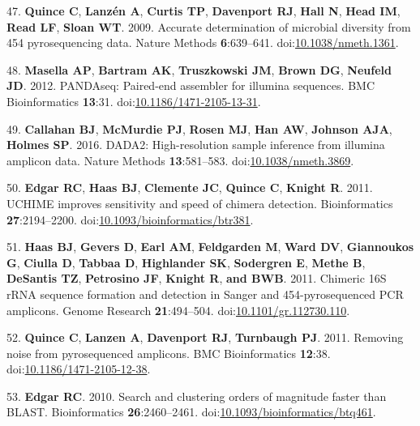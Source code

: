 \documentclass[11pt,]{article}
\begin{document}
\leavevmode\hypertarget{ref-Quince2009}{}%
47. \textbf{Quince C}, \textbf{Lanzén A}, \textbf{Curtis TP},
\textbf{Davenport RJ}, \textbf{Hall N}, \textbf{Head IM}, \textbf{Read
LF}, \textbf{Sloan WT}. 2009. Accurate determination of microbial
diversity from 454 pyrosequencing data. Nature Methods
\textbf{6}:639--641.
doi:\href{https://doi.org/10.1038/nmeth.1361}{10.1038/nmeth.1361}.

\leavevmode\hypertarget{ref-Masella2012}{}%
48. \textbf{Masella AP}, \textbf{Bartram AK}, \textbf{Truszkowski JM},
\textbf{Brown DG}, \textbf{Neufeld JD}. 2012. PANDAseq: Paired-end
assembler for illumina sequences. BMC Bioinformatics \textbf{13}:31.
doi:\href{https://doi.org/10.1186/1471-2105-13-31}{10.1186/1471-2105-13-31}.

\leavevmode\hypertarget{ref-Callahan2016}{}%
49. \textbf{Callahan BJ}, \textbf{McMurdie PJ}, \textbf{Rosen MJ},
\textbf{Han AW}, \textbf{Johnson AJA}, \textbf{Holmes SP}. 2016. DADA2:
High-resolution sample inference from illumina amplicon data. Nature
Methods \textbf{13}:581--583.
doi:\href{https://doi.org/10.1038/nmeth.3869}{10.1038/nmeth.3869}.

\leavevmode\hypertarget{ref-Edgar2011}{}%
50. \textbf{Edgar RC}, \textbf{Haas BJ}, \textbf{Clemente JC},
\textbf{Quince C}, \textbf{Knight R}. 2011. UCHIME improves sensitivity
and speed of chimera detection. Bioinformatics \textbf{27}:2194--2200.
doi:\href{https://doi.org/10.1093/bioinformatics/btr381}{10.1093/bioinformatics/btr381}.

\leavevmode\hypertarget{ref-Haas2011}{}%
51. \textbf{Haas BJ}, \textbf{Gevers D}, \textbf{Earl AM},
\textbf{Feldgarden M}, \textbf{Ward DV}, \textbf{Giannoukos G},
\textbf{Ciulla D}, \textbf{Tabbaa D}, \textbf{Highlander SK},
\textbf{Sodergren E}, \textbf{Methe B}, \textbf{DeSantis TZ},
\textbf{Petrosino JF}, \textbf{Knight R}, \textbf{and BWB}. 2011.
Chimeric 16S rRNA sequence formation and detection in Sanger and
454-pyrosequenced PCR amplicons. Genome Research \textbf{21}:494--504.
doi:\href{https://doi.org/10.1101/gr.112730.110}{10.1101/gr.112730.110}.

\leavevmode\hypertarget{ref-Quince2011}{}%
52. \textbf{Quince C}, \textbf{Lanzen A}, \textbf{Davenport RJ},
\textbf{Turnbaugh PJ}. 2011. Removing noise from pyrosequenced
amplicons. BMC Bioinformatics \textbf{12}:38.
doi:\href{https://doi.org/10.1186/1471-2105-12-38}{10.1186/1471-2105-12-38}.

\leavevmode\hypertarget{ref-Edgar2010}{}%
53. \textbf{Edgar RC}. 2010. Search and clustering orders of magnitude
faster than BLAST. Bioinformatics \textbf{26}:2460--2461.
doi:\href{https://doi.org/10.1093/bioinformatics/btq461}{10.1093/bioinformatics/btq461}.
\end{document}
